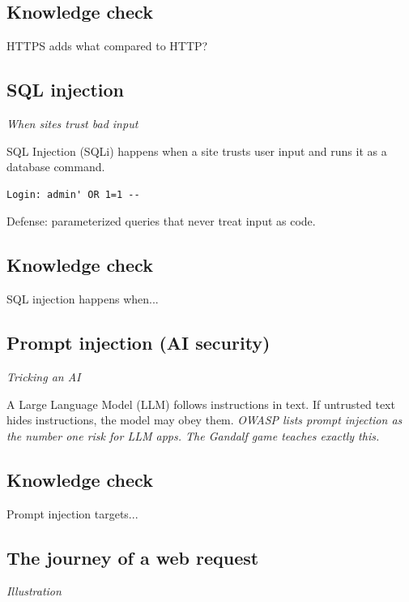 \documentclass[12pt,openany]{book}
\begin{document}
\medskip

\subsection*{Knowledge check}

HTTPS adds what compared to HTTP?

\medskip

\subsection*{SQL injection}
{\small\itshape\color{gray}When sites trust bad input}


SQL Injection (SQLi) happens when a site trusts user input and runs it as a database command.

\begin{lstlisting}
Login: admin' OR 1=1 --\end{lstlisting}

Defense: parameterized queries that never treat input as code.

\medskip

\subsection*{Knowledge check}

SQL injection happens when...

\medskip

\subsection*{Prompt injection (AI security)}
{\small\itshape\color{gray}Tricking an AI}


A Large Language Model (LLM) follows instructions in text. If untrusted text hides instructions, the model may obey them.
{\small\itshape\color{gray}OWASP lists prompt injection as the number one risk for LLM apps. The Gandalf game teaches exactly this.}

\medskip

\subsection*{Knowledge check}

Prompt injection targets...

\medskip

\subsection*{The journey of a web request}
{\small\itshape\color{gray}Illustration}
\end{document}
